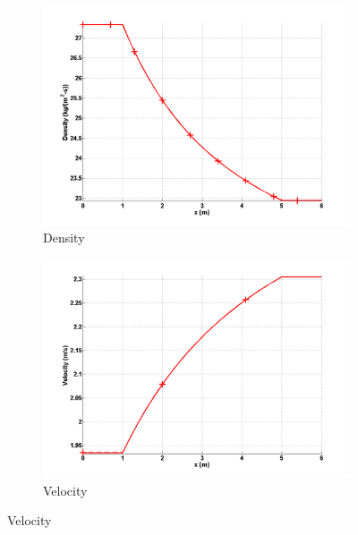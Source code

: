 \begin{figure}[H]
        \centering
        \begin{subfigure}[b]{0.495\textwidth}
                \centering
                \includegraphics[width=\textwidth]{figures/vapor_friction_heat_density_source_terms.png}
                \caption{Density}
                \label{fig:1d-vapor-friction-heat-density-sct3}
        \end{subfigure}%
        \begin{subfigure}[b]{0.495\textwidth}
                \centering
                \includegraphics[width=\textwidth]{figures/vapor_friction_heat_velocity_source_terms.png}
                \caption{Velocity}
                \label{fig:1d-vapor-friction-heat-velocity-sct3}
        \end{subfigure}


\end{figure}

